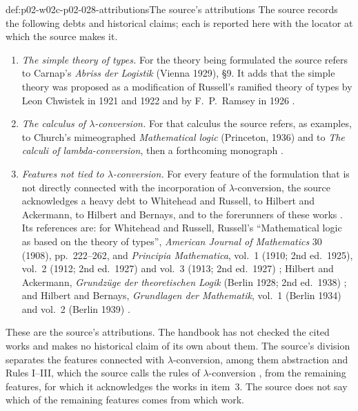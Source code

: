 \begin{hbconvention}{def:p02-w02c-p02-028-attributions}{The source's attributions}
The source records the following debts and historical claims; each is
reported here with the locator at which the source makes it.
\begin{enumerate}
 \item \emph{The simple theory of types.}  For the theory being formulated
   the source refers to Carnap's \emph{Abriss der Logistik} (Vienna 1929),
   \S9.  It adds that the simple theory was proposed as a modification of
   Russell's ramified theory of types by Leon Chwistek in 1921 and 1922 and by
   F.~P.~Ramsey in 1926 \cite[p.~56, n.~1]{Church1940}.
 \item \emph{The calculus of \(\lambda\)-conversion.}  For that calculus the
   source refers, as examples, to Church's mimeographed \emph{Mathematical
   logic} (Princeton, 1936) and to \emph{The calculi of lambda-conversion},
   then a forthcoming monograph \cite[p.~56, n.~2]{Church1940}.
 \item \emph{Features not tied to \(\lambda\)-conversion.}  For every feature
   of the formulation that is not directly connected with the incorporation
   of \(\lambda\)-conversion, the source acknowledges a heavy debt to
   Whitehead and Russell, to Hilbert and Ackermann, to Hilbert and Bernays,
   and to the forerunners of these works \cite[p.~56]{Church1940}.  Its
   references are: for Whitehead and Russell, Russell's ``Mathematical logic
   as based on the theory of types'', \emph{American Journal of Mathematics}
   30 (1908), pp.~222--262, and \emph{Principia Mathematica}, vol.~1 (1910;
   2nd ed.\ 1925), vol.~2 (1912; 2nd ed.\ 1927) and vol.~3 (1913; 2nd ed.\
   1927) \cite[p.~56, n.~3]{Church1940}; Hilbert and Ackermann,
   \emph{Grundz\"uge der theoretischen Logik} (Berlin 1928; 2nd ed.\ 1938)
   \cite[p.~56, n.~4]{Church1940}; and Hilbert and Bernays, \emph{Grundlagen
   der Mathematik}, vol.~1 (Berlin 1934) and vol.~2 (Berlin 1939)
   \cite[p.~56, n.~5]{Church1940}.
\end{enumerate}
These are the source's attributions.  The handbook has not checked the
cited works and makes no historical claim of its own about them.  The
source's division separates the features connected with
\(\lambda\)-conversion, among them abstraction and Rules I--III, which the
source calls the rules of \(\lambda\)-conversion
\cite[\S3, p.~60]{Church1940}, from the remaining features, for which it
acknowledges the works in item~3.  The source does not say which of the
remaining features comes from which work.
\end{hbconvention}

